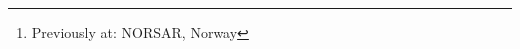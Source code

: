 \author{
Hom Nath Gharti\footnote{Previously at: NORSAR, Norway}, Princeton University, USA \\
Dimitri Komatitsch, Aix-Marseille University, France\\
Volker Oye, NORSAR, Norway \\
Roland Martin, University of Toulouse, France \\
Jeroen Tromp, Princeton University, USA \\
Zhenzhen Yan, Institute of Remote Sensing and Digital Earth, CAS, China
}
